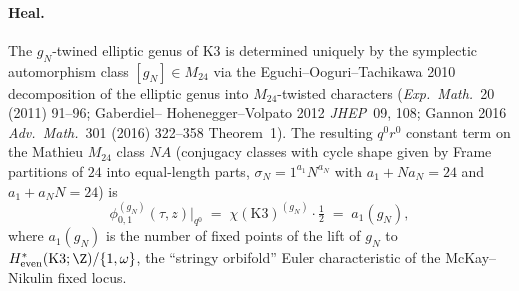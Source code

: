 \paragraph{Heal.} The $g_N$-twined elliptic genus of K3 is
determined uniquely by the symplectic automorphism class
$[g_N] \in M_{24}$ via the Eguchi--Ooguri--Tachikawa 2010
decomposition of the elliptic genus into $M_{24}$-twisted
characters (\emph{Exp.\ Math.}~20 (2011) 91--96; Gaberdiel--
Hohenegger--Volpato 2012 \emph{JHEP}~09, 108; Gannon 2016
\emph{Adv.\ Math.}~301 (2016) 322--358 Theorem~1). The resulting
$q^0 r^0$ constant term on the Mathieu $M_{24}$ class $N A$
(conjugacy classes with cycle shape given by Frame partitions of
$24$ into equal-length parts, $\sigma_N = 1^{a_1} N^{a_N}$ with
$a_1 + N a_N = 24$ and $a_1 + a_N N = 24$) is
\[
  \phi^{(g_N)}_{0, 1}(\tau, z)\big|_{q^0}
  \;=\; \chi(\mathrm{K3})^{(g_N)} \cdot \tfrac{1}{2}
  \;=\; a_1(g_N),
\]
where $a_1(g_N)$ is the number of fixed points of the lift of
$g_N$ to $H^*_{\mathrm{even}}(\mathrm{K3}; \Z)/\{1, \omega\}$,
the ``stringy orbifold'' Euler characteristic of the McKay--
Nikulin fixed locus.

